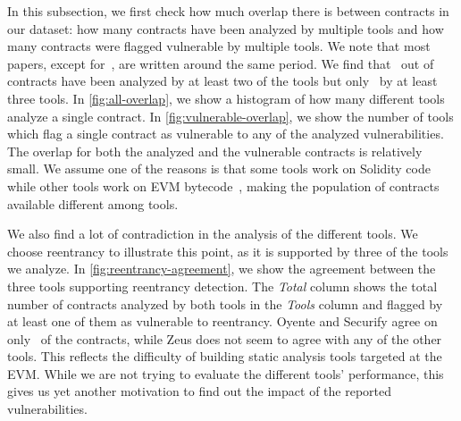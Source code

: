 
In this subsection, we first check how much overlap there is between contracts in our dataset: how many contracts have been analyzed by multiple tools and how many contracts were flagged vulnerable by multiple tools.
We note that most papers, except for~\cite{luu2016a}, are written around the same period.
We find that~ out of~ contracts have been analyzed by at least two of the tools but only~ by at least three tools.
In \autoref{fig:all-overlap}, we show a histogram of how many different tools analyze a single contract. In \autoref{fig:vulnerable-overlap}, we show the number of tools which flag a single contract as vulnerable to any of the analyzed vulnerabilities. The overlap for both the analyzed and the vulnerable contracts is relatively small. We assume one of the reasons is that some tools work on Solidity code~\cite{DBLP:conf/ndss/KalraGDS18} while other tools work on EVM bytecode~\cite{Tsankov2018,luu2016a}, making the population of contracts available different among tools.

We also find a lot of contradiction in the analysis of the different tools.
We choose reentrancy to illustrate this point, as it is supported by three of the tools we analyze. In \autoref{fig:reentrancy-agreement}, we show the agreement between the three tools supporting reentrancy detection. The \emph{Total} column shows the total number of contracts analyzed by both tools in the \emph{Tools} column and flagged by at least one of them as vulnerable to reentrancy. Oyente and Securify agree on only~ of the contracts, while Zeus does not seem to agree with any of the other tools.
This reflects the difficulty of building static analysis tools targeted at the EVM. While we are not trying to evaluate the different tools' performance, this gives us yet another motivation to find out the impact of the reported vulnerabilities.
